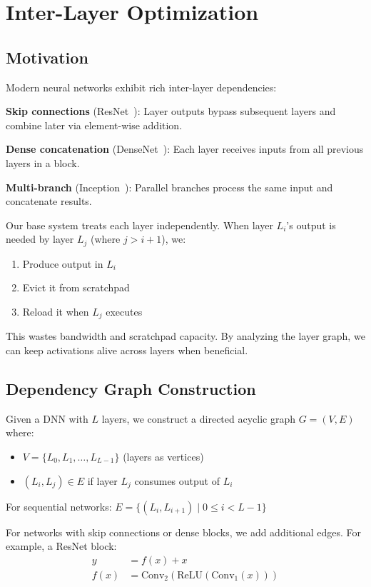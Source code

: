 \documentclass[journal]{IEEEtran}
\begin{document}
\section{Inter-Layer Optimization}

\subsection{Motivation}

Modern neural networks exhibit rich inter-layer dependencies:

\textbf{Skip connections} (ResNet~\cite{he2016resnet}): Layer outputs bypass subsequent layers and combine later via element-wise addition.

\textbf{Dense concatenation} (DenseNet~\cite{huang2017densenet}): Each layer receives inputs from all previous layers in a block.

\textbf{Multi-branch} (Inception~\cite{szegedy2015inception}): Parallel branches process the same input and concatenate results.

Our base system treats each layer independently. When layer $L_i$'s output is needed by layer $L_j$ (where $j > i+1$), we:
\begin{enumerate}
\item Produce output in $L_i$
\item Evict it from scratchpad
\item Reload it when $L_j$ executes
\end{enumerate}

This wastes bandwidth and scratchpad capacity. By analyzing the layer graph, we can keep activations alive across layers when beneficial.

\subsection{Dependency Graph Construction}

Given a DNN with $L$ layers, we construct a directed acyclic graph $G = (V, E)$ where:
\begin{itemize}
\item $V = \{L_0, L_1, \ldots, L_{L-1}\}$ (layers as vertices)
\item $(L_i, L_j) \in E$ if layer $L_j$ consumes output of $L_i$
\end{itemize}

For sequential networks: $E = \{(L_i, L_{i+1}) \mid 0 \leq i < L-1\}$

For networks with skip connections or dense blocks, we add additional edges. For example, a ResNet block:
\begin{align}
y &= f(x) + x \nonumber \\
f(x) &= \text{Conv}_2(\text{ReLU}(\text{Conv}_1(x)))
\end{align}
\end{document}
